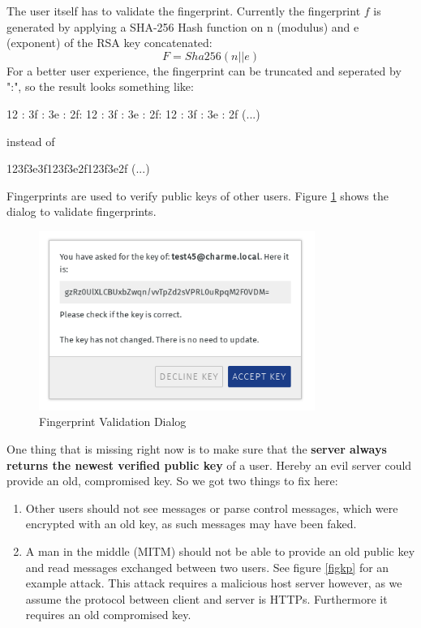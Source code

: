 \documentclass{scrartcl}
\begin{document}
The user itself has to validate the fingerprint. Currently the fingerprint $f$ is generated by applying a SHA-256 Hash function on n (modulus) and e (exponent) of the RSA key concatenated:
   $$
   F = Sha256(n || e)
   $$
 For a better user experience, the fingerprint can be truncated and  seperated by ":", so the result looks something like:
  
   \begin{center}
   12 : 3f : 3e : 2f: 12 : 3f : 3e : 2f: 12 : 3f : 3e : 2f (...)
   \end{center}
  
  instead of 
  
  \begin{center}
  123f3e3f123f3e2f123f3e2f (...)
  \end{center}
  
  Fingerprints are used to verify public keys of other users.
  Figure \ref{figFP} shows the dialog to validate fingerprints.\\
  
  \begin{figure}[ht]
	\centering
  \includegraphics[width=90mm]{illustrations/fingerprint.png}
	\caption{Fingerprint Validation Dialog}
	\label{figFP}
\end{figure}


One thing that is missing right now is to make sure that the \textbf{server always returns the newest verified public key} of a user. Hereby an evil server could provide an old, compromised key. So we got two things to fix here:
\begin{enumerate}
\item Other users should not see messages or parse  control messages, which were encrypted with an old key, as such messages may have been faked.
\item A man in the middle (MITM) should not be able to provide an old public key and read messages exchanged between two users. See figure \ref{figkp} for an example attack. This attack requires a malicious host server however, as we assume the protocol between client and server is HTTPs. Furthermore it requires an old compromised key.
\end {enumerate}
\end{document}
